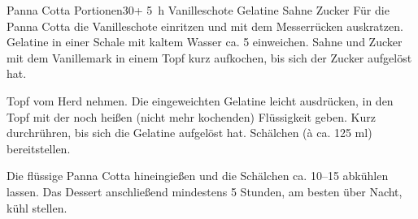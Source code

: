\begin{MyRecipe}{Panna Cotta}{ Portionen}{\SI{30}{\minuteprime}+ \SI{5}{\hour}}
	\ingredient[\Calc{1}{\x}]{} {Vanilleschote}
	 {Gelatine}
	\ingredient[\Calc{0.4}{\x}]{\si{\kilogram}} {Sahne}
	\ingredient[\Calc{120}{\x}]{\si{\gram}} {Zucker}
	Für die Panna Cotta die Vanilleschote einritzen und mit dem Messerrücken auskratzen. Gelatine in einer Schale mit kaltem Wasser ca. \SI{5}{\minuteprime} einweichen. Sahne und Zucker mit dem Vanillemark in einem Topf kurz aufkochen, bis sich der Zucker aufgelöst hat.\par\bigskip
	Topf vom Herd nehmen. Die eingeweichten Gelatine leicht ausdrücken, in den Topf mit der noch heißen (nicht mehr kochenden) Flüssigkeit geben. Kurz durchrühren, bis sich die Gelatine aufgelöst hat. Schälchen (à ca. 125 ml) bereitstellen.\par\bigskip
	Die flüssige Panna Cotta hineingießen und die Schälchen ca. \SIrange{10}{15}{\minuteprime} abkühlen lassen. Das Dessert anschließend mindestens 5 Stunden, am besten über Nacht, kühl stellen.\par\bigskip
\end{MyRecipe}